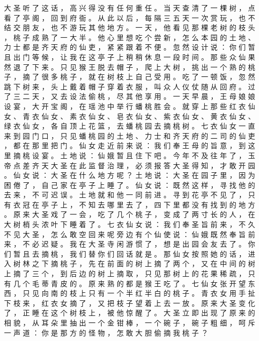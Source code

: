 {大 圣 听 了 这 话 ， 高 兴 得 没 有 任 何 重 任 。
当 天 查 清 了 一 棵 树 ， 点 看 了 亭 阁 ， 回 到 府 衙 。
从 此 以 后 ， 每 隔 三 五 天 一 次 赏 玩 ， 也 不 结 交 朋 友 ， 也 不 游 玩 其 他 地 方 。
一 天 ， 他 看 见 那 棵 老 树 的 枝 头 ， 桃 子 成 熟 了 一 大 半 。
他 心 里 想 吃 个 尝 新 ， 怎 么 本 园 的 土 地 、 力 士 都 是 齐 天 府 的 仙 吏 ， 紧 紧 跟 着 不 便 。
忽 然 设 计 说 ： 你 们 暂 且 出 门 等 候 ， 让 我 在 这 亭 子 上 稍 稍 休 息 一 段 时 间 。
那 些 众 仙 果 然 退 了 下 来 。
只 见 猴 王 脱 去 帽 子 ， 爬 上 大 树 ， 挑 出 一 个 熟 的 桃 子 ， 摘 了 很 多 桃 子 ， 就 在 树 枝 上 自 己 受 用 。
吃 了 一 顿 饭 ， 忽 然 跳 下 树 来 ， 头 上 戴 着 帽 子 穿 着 衣 服 ， 叫 众 人 仪 仗 随 从 回 府 。
过 了 三 二 天 ， 又 去 设 法 偷 桃 ， 尽 其 他 享 用 。
一 天 早 晨 ， 王 母 娘 娘 设 宴 ， 大 开 宝 阁 ， 在 瑶 池 中 举 行 蟠 桃 胜 会 。
就 穿 上 那 些 红 衣 仙 女 、 青 衣 仙 女 、 素 衣 仙 女 、 皂 衣 仙 女 、 紫 衣 仙 女 、 黄 衣 仙 女 、 绿 衣 仙 女 ， 各 自 顶 上 花 篮 ， 去 蟠 桃 园 去 摘 桃 树 。
七 衣 仙 女 一 直 来 到 园 门 口 ， 只 见 蟠 桃 园 的 土 地 、 力 士 和 齐 天 府 的 二 司 的 仙 吏 ， 都 在 那 里 把 门 。
仙 女 走 近 前 来 说 ： 我 们 奉 王 母 的 旨 意 ， 到 这 里 摘 桃 设 宴 。
土 地 说 ： 仙 娥 暂 且 住 下 吧 。
今 年 不 及 往 年 了 ， 玉 帝 点 差 齐 天 大 圣 在 此 监 督 治 理 ， 必 须 报 答 大 圣 得 知 ， 才 敢 开 园 。
仙 女 说 ： 大 圣 在 什 么 地 方 呢 ？ 土 地 说 ： 大 圣 在 园 子 里 ， 因 为 困 倦 了 ， 自 己 家 在 亭 子 上 睡 了 。
仙 女 说 ： 既 然 这 样 ， 寻 找 他 的 去 来 ， 不 可 迟 误 。
土 地 就 和 他 一 同 前 进 。
寻 到 花 亭 不 见 了 ， 只 有 衣 冠 在 亭 子 上 ， 不 知 去 哪 里 去 了 ， 四 下 里 都 没 有 找 到 的 地 方 。
原 来 大 圣 戏 了 一 会 ， 吃 了 几 个 桃 子 ， 变 成 了 两 寸 长 的 人 ， 在 大 树 梢 头 浓 叶 下 睡 着 了 。
七 衣 仙 女 说 ： 我 们 奉 圣 旨 前 来 ， 不 久 不 见 大 圣 ， 怎 么 敢 空 回 来 呢 旁 边 有 个 仙 使 说 ： 仙 娥 既 然 奉 旨 前 来 ， 不 必 迟 疑 。
我 在 大 圣 寺 闲 游 惯 了 ， 想 是 出 园 会 友 去 了 。
你 们 暂 且 去 摘 桃 ， 我 们 替 你 们 回 话 就 是 。
那 仙 女 按 照 她 的 话 ， 进 入 树 林 之 下 摘 桃 子 ， 先 在 前 面 的 树 上 摘 了 两 个 ， 又 在 中 间 的 树 上 摘 了 三 个 ， 到 后 边 的 树 上 摘 取 ， 只 见 那 树 上 的 花 果 稀 疏 ， 只 有 几 个 毛 蒂 青 皮 的 。
原 来 熟 的 都 是 猴 王 吃 了 。
七 仙 女 张 开 望 东 西 ， 只 见 向 南 的 枝 上 只 有 一 个 半 红 半 白 的 桃 子 。
青 衣 女 用 手 扯 下 枝 来 ， 红 衣 女 摘 了 ， 又 把 枝 子 望 着 上 去 一 放 。
原 来 大 圣 变 化 了 ， 正 睡 在 这 个 树 枝 上 ， 被 他 惊 醒 了 。
大 圣 立 即 出 现 了 原 来 的 相 貌 ， 从 耳 朵 里 抽 出 一 个 金 钳 棒 ， 一 个 碗 子 ， 碗 子 粗 细 ， 呵 斥 一 声 道 ： 你 是 那 方 的 怪 物 ， 怎 敢 大 胆 偷 摘 我 桃 子 ？
}
